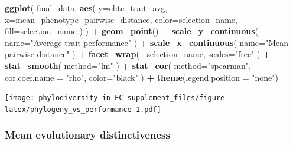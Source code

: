 \documentclass[]{book}
\newenvironment{Shaded}{\begin{snugshade}}{\end{snugshade}}
\newcommand{\DataTypeTok}[1]{\textcolor[rgb]{0.13,0.29,0.53}{#1}}
\newcommand{\KeywordTok}[1]{\textcolor[rgb]{0.13,0.29,0.53}{\textbf{#1}}}
\newcommand{\NormalTok}[1]{#1}
\newcommand{\OperatorTok}[1]{\textcolor[rgb]{0.81,0.36,0.00}{\textbf{#1}}}
\newcommand{\StringTok}[1]{\textcolor[rgb]{0.31,0.60,0.02}{#1}}
\begin{document}
\begin{Shaded}
\begin{Highlighting}[]
\KeywordTok{ggplot}\NormalTok{(}
\NormalTok{    final_data,}
    \KeywordTok{aes}\NormalTok{(}
        \DataTypeTok{y=}\NormalTok{elite_trait_avg,}
        \DataTypeTok{x=}\NormalTok{mean_phenotype_pairwise_distance,}
        \DataTypeTok{color=}\NormalTok{selection_name,}
        \DataTypeTok{fill=}\NormalTok{selection_name}
\NormalTok{    )}
\NormalTok{  ) }\OperatorTok{+}
\StringTok{  }\KeywordTok{geom_point}\NormalTok{() }\OperatorTok{+}
\StringTok{    }\KeywordTok{scale_y_continuous}\NormalTok{(}
        \DataTypeTok{name=}\StringTok{"Average trait performance"}
\NormalTok{  ) }\OperatorTok{+}
\StringTok{  }\KeywordTok{scale_x_continuous}\NormalTok{(}
        \DataTypeTok{name=}\StringTok{"Mean pairwise distance"}
\NormalTok{  ) }\OperatorTok{+}\StringTok{ }
\StringTok{  }\KeywordTok{facet_wrap}\NormalTok{(}
      \OperatorTok{~}\NormalTok{selection_name, }\DataTypeTok{scales=}\StringTok{"free"}
\NormalTok{  ) }\OperatorTok{+}\StringTok{ }
\StringTok{  }\KeywordTok{stat_smooth}\NormalTok{(}
    \DataTypeTok{method=}\StringTok{"lm"}
\NormalTok{  ) }\OperatorTok{+}\StringTok{ }
\StringTok{  }\KeywordTok{stat_cor}\NormalTok{(}
    \DataTypeTok{method=}\StringTok{"spearman"}\NormalTok{, }\DataTypeTok{cor.coef.name =} \StringTok{"rho"}\NormalTok{, }\DataTypeTok{color=}\StringTok{"black"}
\NormalTok{  ) }\OperatorTok{+}
\StringTok{  }\KeywordTok{theme}\NormalTok{(}\DataTypeTok{legend.position =} \StringTok{"none"}\NormalTok{)}
\end{Highlighting}
\end{Shaded}

\texttt{[image: phylodiversity-in-EC-supplement\_files/figure-latex/phylogeny\_vs\_performance-1.pdf]}

\hypertarget{mean-evolutionary-distinctiveness-4}{%
\subsubsection{Mean evolutionary distinctiveness}\label{mean-evolutionary-distinctiveness-4}}
\end{document}
